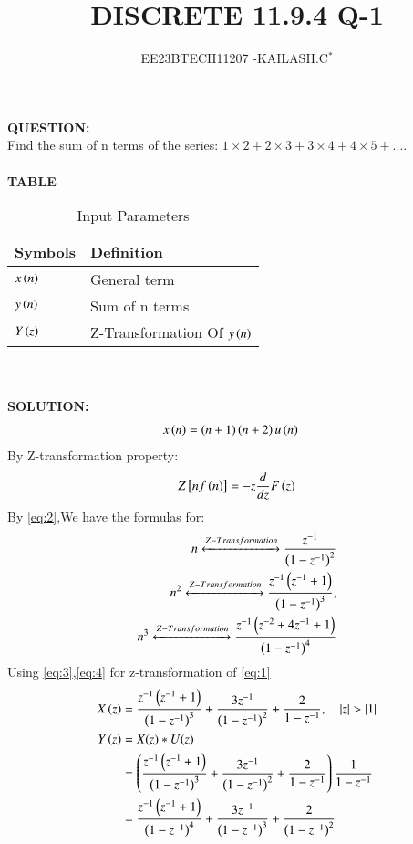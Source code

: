 \documentclass[journal,12pt,twocolumn]{IEEEtran}
\theoremstyle{remark}
\begin{document}

\vspace{3cm}

\title{DISCRETE 11.9.4 Q-1}
\author{EE23BTECH11207 -KAILASH.C$^{*}$%
}
\maketitle
\newpage
\bigskip

\renewcommand{\thefigure}{\theenumi}
\renewcommand{\thetable}{\theenumi}


\textbf{QUESTION:}\\
Find the sum of n terms of the series:
$1\times2+2\times3+3\times4+4\times5+....$\\ \\
\textbf{TABLE}\\
\begin{table}[h]
\begin{tabular}{|l|l|}
\hline
\textbf{Symbols} & \textbf{Definition}\\ \hline
$x\left(n\right)$ & General term \\ \hline
$y\left(n\right)$ & Sum of n terms \\ \hline
$Y\left(z\right)$ & Z-Transformation Of $y\left(n\right)$\\ \hline
\end{tabular}
\caption{Input Parameters}
\label{Fig:1}
\end{table}\\ \\
\textbf{SOLUTION:}\\
\begin{align}
 x\left(n\right)&=\left(n+1\right)\left(n+2\right)u\left(n\right)   \label{eq:1}
\end{align}
By Z-transformation property:
\begin{align}
Z{}\left[nf\left(n\right)\right]=-z\frac{d}{dz}F\left(z\right)\label{eq:2}
\end{align}
By \eqref{eq:2},We have the formulas for:
\begin{align}
n\xleftrightarrow[]{Z-Transformation} \frac{z^{-1}}{\left(1-z^{-1}\right)^2}\label{eq:3}\\
n^2\xleftrightarrow[]{Z-Transformation}\frac{z^{-1}\left(z^{-1}+1\right)}{\left(1-z^{-1}\right)^3},\label{eq:4}\\
n^3\xleftrightarrow[]{Z-Transformation}\frac{z^{-1}\left(z^{-2}+4z^{-1}+1\right)}{\left(1-z^{-1}\right)^4}\label{eq:5}
\end{align}
Using \eqref{eq:3},\eqref{eq:4} for z-transformation of \eqref{eq:1}
\begin{align}
    X\left(z\right)&=\frac{z^{-1}\left(z^{-1}+1\right)}{\left(1-z^{-1}\right)^3}+\frac{3z^{-1}}{\left(1-z^{-1}\right)^2}+\frac{2}{1-z^{-1}},\quad\left\vert z\right\vert>\left\vert1\right\vert\label{eq:6}\\
    Y\left(z\right)&=X(z)*U(z)\label{eq:7}\\
   &=\left(\frac{z^{-1}\left(z^{-1}+1\right)}{\left(1-z^{-1}\right)^3}+\frac{3z^{-1}}{\left(1-z^{-1}\right)^2}+\frac{2}{1-z^{-1}}\right)\frac{1}{1-z^{-1}}\label{eq:8}\\
    &=\frac{z^{-1}\left(z^{-1}+1\right)}{\left(1-z^{-1}\right)^4}+\frac{3z^{-1}}{\left(1-z^{-1}\right)^3}+\frac{2}{\left(1-z^{-1}\right)^2}\label{eq:9}
\end{align}
\end{document}
